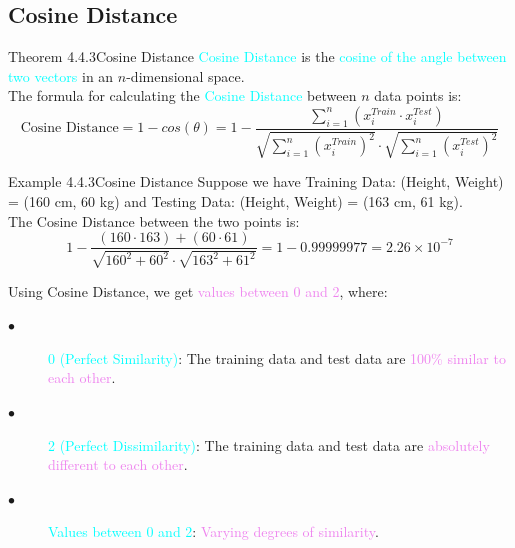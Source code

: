 \documentclass{book}
\begin{document}
\subsection{Cosine Distance}
\begin{thmBox}{Theorem 4.4.3}{Cosine Distance}
    \textcolor{cyan}{Cosine Distance} is the \textcolor{cyan}{cosine of the angle between two vectors} in an \(n\)-dimensional space.\\
    The formula for calculating the \textcolor{cyan}{Cosine Distance} between \(n\) data points is:
    \[
        \text{Cosine Distance} = 1 - cos(\theta) = 1 - \frac{\sum_{i=1}^{n} (x_i^{Train} \cdot x_i^{Test})}{\sqrt{\sum_{i=1}^{n} (x_i^{Train})^2} \cdot \sqrt{\sum_{i=1}^{n} (x_i^{Test})^2}}
    \]
\end{thmBox}
\begin{egBox}{Example 4.4.3}{Cosine Distance}
    Suppose we have Training Data: (Height, Weight) = (160 cm, 60 kg) and Testing Data: (Height, Weight) = (163 cm, 61 kg).\\
    The Cosine Distance between the two points is:
    \[
        1 - \frac{(160 \cdot 163) + (60 \cdot 61)}{\sqrt{160^2 + 60^2} \cdot \sqrt{163^2 + 61^2}} = 1 - 0.99999977 = 2.26 \times 10^{-7}
    \]
\end{egBox}
Using Cosine Distance, we get \textcolor{violet}{values between 0 and 2}, where:\\
\begin{description}
    \item[$\bullet$] \textcolor{cyan}{0 (Perfect Similarity)}: The training data and test data are \textcolor{violet}{100\% similar to each other}.
    \item[$\bullet$] \textcolor{cyan}{2 (Perfect Dissimilarity)}: The training data and test data are \textcolor{violet}{absolutely different to each other}.
    \item[$\bullet$] \textcolor{cyan}{Values between 0 and 2}: \textcolor{violet}{Varying degrees of similarity}.
\end{description}
\end{document}
